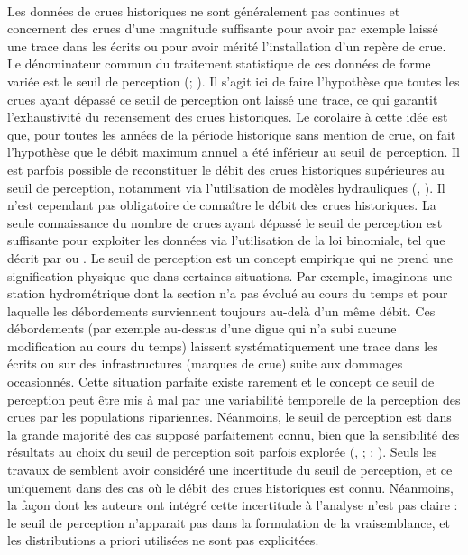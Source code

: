 	\paragraph{} Les données de crues historiques ne sont généralement pas continues et concernent des crues d'une magnitude suffisante pour avoir par exemple laissé une trace dans les écrits ou pour avoir mérité l'installation d'un repère de crue. Le dénominateur commun du traitement statistique de ces données de forme variée est le seuil de perception (\cite{gerard_probability_1979}; \cite{stedinger_flood_1986}). Il s'agit ici de faire l'hypothèse que toutes les crues ayant dépassé ce seuil de perception ont laissé une trace, ce qui garantit l'exhaustivité du recensement des crues historiques. Le corolaire à cette idée est que, pour toutes les années de la période historique sans mention de crue, on fait l'hypothèse que le débit maximum annuel a été inférieur au seuil de perception. Il est parfois possible de reconstituer le débit des crues historiques supérieures au seuil de perception, notamment via l'utilisation de modèles hydrauliques (\cite{neppel_flood_2010}, \cite{machado_flood_2015}). Il n'est cependant pas obligatoire de connaître le débit des crues historiques. La seule connaissance du nombre de crues ayant dépassé le seuil de perception est suffisante pour exploiter les données via l'utilisation de la loi binomiale, tel que décrit par \citet{stedinger_flood_1986} ou \citet{payrastre_usefulness_2011}. Le seuil de perception est un concept empirique qui ne prend une signification physique que dans certaines situations. Par exemple, imaginons une station hydrométrique dont la section n'a pas évolué au cours du temps et pour laquelle les débordements surviennent toujours au-delà d'un même débit. Ces débordements (par exemple au-dessus d'une digue qui n'a subi aucune modification au cours du temps) laissent systématiquement une trace dans les écrits ou sur des infrastructures (marques de crue) suite aux dommages occasionnés. Cette situation parfaite existe rarement et le concept de seuil de perception peut être mis à mal par une variabilité temporelle de la perception des crues par les populations ripariennes. Néanmoins, le seuil de perception est dans la grande majorité des cas supposé parfaitement connu, bien que la sensibilité des résultats au choix du seuil de perception soit parfois explorée (\cite{stedinger_flood_1986}, \cite{viglione_flood_2013}; \cite{macdonald_reassessing_2014}; \cite{payrastre_usefulness_2011}). Seuls les travaux de \citet{parkes_defining_2016} semblent avoir considéré une incertitude du seuil de perception, et ce uniquement dans des cas où le débit des crues historiques est connu. Néanmoins, la façon dont les auteurs ont intégré cette incertitude à l'analyse n'est pas claire : le seuil de perception n'apparait pas dans la formulation de la vraisemblance, et les distributions a priori utilisées ne sont pas explicitées. 

